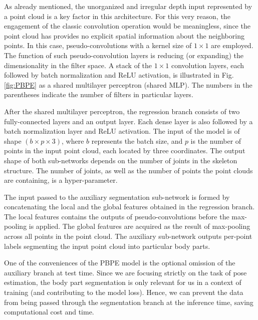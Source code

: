 \noindent
As already mentioned, the unorganized and irregular depth input represented by a point cloud is a key factor in this architecture. For this very reason, the engagement of the classic convolution operation would be meaningless, since the point cloud has provides no explicit spatial information about the neighboring points. In this case, pseudo-convolutions with a kernel size of $1\times1$ are employed. The function of such pseudo-convolution layers is reducing (or expanding) the dimensionality in the filter space. A stack of the $1 \times 1$ convolution layers, each followed by batch normalization and ReLU activation, is illustrated in Fig. \ref{fig:PBPE} as a shared multilayer perceptron (shared MLP). The numbers in the parentheses indicate the number of filters in particular layers.\par
\vspace{5mm}
\noindent After the shared multilayer perceptron, the regression branch consists of two fully-connected layers and an output layer. Each dense layer is also followed by a batch normalization layer and ReLU activation. The input of the model is of shape $(b \times p \times 3)$, where $b$ represents the batch size, and $p$ is the number of points in the input point cloud, each located by three coordinates. The output shape of both sub-networks depends on the number of joints in the skeleton structure. The number of joints, as well as the number of points the point clouds are containing, is a hyper-parameter.\par
\vspace{5mm}
\noindent The input passed to the auxiliary segmentation sub-network is formed by concatenating the local and the global features obtained in the regression branch. The local features contains the outputs of pseudo-convolutions before the max-pooling is applied. The global features are acquired as the result of max-pooling across all points in the point cloud. The auxiliary sub-network outputs per-point labels segmenting the input point cloud into particular body parts.\par
\vspace{5mm}
\noindent One of the conveniences of the PBPE model is the optional omission of the auxiliary branch at test time. Since we are focusing strictly on the task of pose estimation, the body part segmentation is only relevant for us in a context of training (and contributing to the model loss). Hence, we can prevent the data from being passed through the segmentation branch at the inference time, saving computational cost and time.

